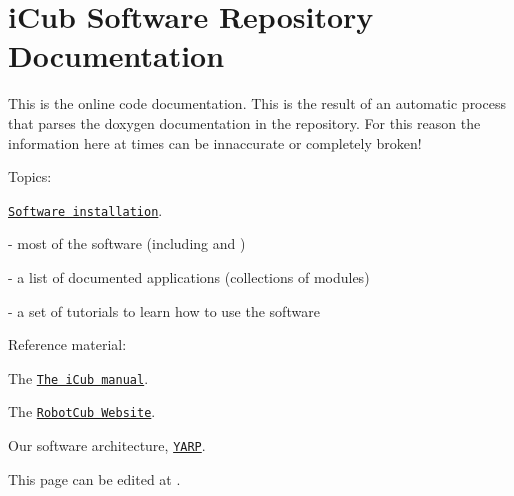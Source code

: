 \chapter{i\+Cub Software Repository Documentation }
\hypertarget{index}{}\label{index}


This is the  online code documentation. This is the result of an automatic process that parses the doxygen documentation in the repository. For this reason the information here at times can be innaccurate or completely broken!

Topics\+:


\begin{DoxyItemize}
\item \href{https://icub-tech-iit.github.io/documentation/sw_installation}{\texttt{Software installation}}.
\item {} -\/ most of the software (including  and )
\item {} -\/ a list of documented applications (collections of modules)
\item {} -\/ a set of tutorials to learn how to use the software
\item Reference material\+:
\begin{DoxyItemize}
\item The \href{https://icub-tech-iit.github.io/documentation/}{\texttt{The i\+Cub manual}}.
\item The \href{http://www.robotcub.org/}{\texttt{Robot\+Cub Website}}.
\item Our software architecture, \href{http://www.yarp.it/}{\texttt{YARP}}.
\end{DoxyItemize}
\end{DoxyItemize}

This page can be edited at . 
